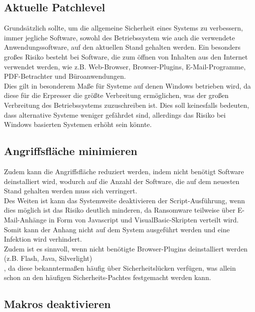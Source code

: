 \subsection{Aktuelle Patchlevel}

	 Grundsätzlich sollte, um die allgemeine Sicherheit eines Systems zu verbessern, immer jegliche Software, sowohl des Betriebssystem wie auch die verwendete Anwendungssoftware, auf den aktuellen Stand gehalten werden. Ein besonders großes Risiko besteht bei Software, die zum öffnen von Inhalten aus den Internet verwendet werden, wie z.B. Web-Browser, Browser-Plugins, E-Mail-Programme, PDF-Betrachter und Büroanwendungen\cite{bsi:ransome}.\\
	 
	 Dies gilt in besonderem Maße für Systeme auf denen Windows betrieben wird, da diese für die Erpresser die größte Verbreitung ermöglichen, was der großen Verbreitung des Betriebssystems zuzuschreiben ist. Dies soll keinesfalls bedeuten, dass alternative Systeme weniger gefährdet sind, allerdings das Risiko bei Windows basierten Systemen erhöht sein könnte.
	 
\subsection{Angriffsfläche minimieren}

	Zudem kann die Angriffsfläche reduziert werden, indem nicht benötigt Software deinstalliert wird, wodurch auf die Anzahl der Software, die auf dem neuesten Stand gehalten werden muss sich verringert.\\
	
	Des Weiten ist kann das Systemweite deaktivieren der Script-Ausführung, wenn dies möglich ist das Risiko deutlich minderen, da Ransomware teilweise über E-Mail-Anhänge in Form von Javascript und VisualBasic-Skripten verteilt wird. Somit kann der Anhang nicht auf dem System ausgeführt werden und eine Infektion wird verhindert\cite{bsi:ransome}.\\
	
	Zudem ist es sinnvoll, wenn nicht benötigte Browser-Plugins deinstalliert werden (z.B. Flash, Java, Silverlight)\cite{bsi:ransome}\\, da diese bekanntermaßen häufig über Sicherheitslücken verfügen, was allein schon an den häufigen Sicherheits-Pachtes festgemacht werden kann.  
	
\subsection{Makros deaktivieren}

